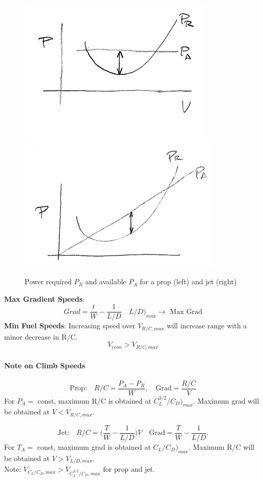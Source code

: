 \documentclass[draft=false, titlepage]{article}
\begin{document}
\begin{figure}[ht]
	\centering
	\includegraphics[width=0.3\linewidth]{Figures/p79_Prprop}
	\includegraphics[width=0.3\linewidth]{Figures/p79_Prjet}
	\caption{Power required $P_R$ and available $P_A$ for a prop (left) and jet (right)}
	\label{fig:p79_Pr}
\end{figure}
\textbf{Max Gradient Speeds}:
\begin{equation*}
Grad = \frac{t}{W} - \frac{1}{L/D} \quad L/D\big)_{max} \rightarrow \text{ Max Grad}
\end{equation*}
\textbf{Min Fuel Speeds}: Increasing speed over $V_{R/C,max}$ will increase range with a minor decrease in R/C.
\begin{equation*}
V_{econ} > V_{R/C,max}
\end{equation*}

\paragraph*{Note on Climb Speeds}
\begin{equation}
\text{Prop:} \quad R/C = \frac{P_A-P_R}{W},\quad \text{Grad} = \frac{R/C}{V}
\end{equation}
For $P_A =$ const, maximum R/C is obtained at $C_L^{3/2}/C_D\big)_{max}$. Maximum grad will be obtained at $V < V_{R/C,max}$.

\begin{equation}
\text{Jet:} \quad  R/C = \Big( \frac{T}{W} - \frac{1}{L/D} \Big)V \quad \text{Grad} = \frac{T}{W} - \frac{1}{L/D}.
\end{equation}
For $T_A =$ const, maximum grad is obtained at $C_L/C_D\big)_{max}$. Maximum R/C will be obtained at $V > V_{L/D,max}$.\\
Note: $V_{C_L/C_D,max} > V_{C_L^{3/2}/C_D,max}$ for prop and jet.

\end{document}
